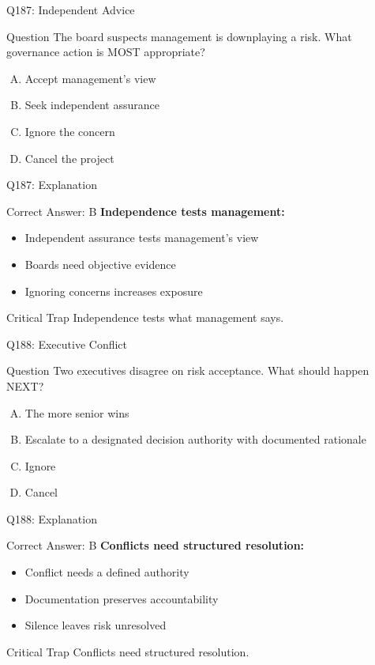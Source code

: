\documentclass{beamer}
\begin{document}
	\begin{frame}{Q187: Independent Advice}
		\begin{block}{Question}
			The board suspects management is downplaying a risk. What governance action is MOST appropriate?
		\end{block}
		\begin{enumerate}[(A)]
			\item Accept management's view
			\item Seek independent assurance
			\item Ignore the concern
			\item Cancel the project
		\end{enumerate}
	\end{frame}
	
	\begin{frame}{Q187: Explanation}
		\begin{block}{Correct Answer: B}
			\textbf{Independence tests management:}
			\begin{itemize}
				\item Independent assurance tests management's view
				\item Boards need objective evidence
				\item Ignoring concerns increases exposure
			\end{itemize}
		\end{block}
		\begin{alertblock}{Critical Trap}
			Independence tests what management says.
		\end{alertblock}
	\end{frame}
	
	\begin{frame}{Q188: Executive Conflict}
		\begin{block}{Question}
			Two executives disagree on risk acceptance. What should happen NEXT?
		\end{block}
		\begin{enumerate}[(A)]
			\item The more senior wins
			\item Escalate to a designated decision authority with documented rationale
			\item Ignore
			\item Cancel
		\end{enumerate}
	\end{frame}
	
	\begin{frame}{Q188: Explanation}
		\begin{block}{Correct Answer: B}
			\textbf{Conflicts need structured resolution:}
			\begin{itemize}
				\item Conflict needs a defined authority
				\item Documentation preserves accountability
				\item Silence leaves risk unresolved
			\end{itemize}
		\end{block}
		\begin{alertblock}{Critical Trap}
			Conflicts need structured resolution.
		\end{alertblock}
	\end{frame}
	
\end{document}
